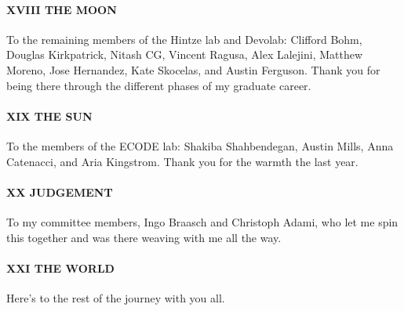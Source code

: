 \paragraph{XVIII THE MOON} To the remaining members of the Hintze lab and Devolab: Clifford Bohm, Douglas Kirkpatrick, Nitash CG, Vincent Ragusa, Alex Lalejini, Matthew Moreno, Jose Hernandez, Kate Skocelas, and Austin Ferguson. Thank you for being there through the different phases of my graduate career.

\paragraph{XIX THE SUN} To the members of the ECODE lab: Shakiba Shahbendegan, Austin Mills, Anna Catenacci, and Aria Kingstrom. Thank you for the warmth the last year.

\paragraph{XX JUDGEMENT} To my committee members, Ingo Braasch and Christoph Adami, who let me spin this together and was there weaving with me all the way.

\paragraph{XXI THE WORLD} Here's to the rest of the journey with you all.